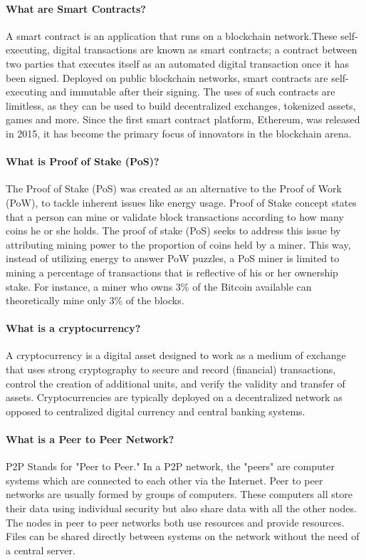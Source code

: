 \paragraph{What are Smart Contracts?} 
A smart contract is an application that runs on a blockchain network.These self-executing, digital transactions are known as smart contracts; a contract between two parties that executes itself as an automated digital transaction once it has been signed. Deployed on public blockchain networks, smart contracts are self-executing and immutable after their signing. The uses of such contracts are limitless, as they can be used to build decentralized exchanges, tokenized assets, games and more. Since the first smart contract platform, Ethereum, was released in 2015, it has become the primary focus of innovators in the blockchain arena.

\paragraph{What is Proof of Stake (PoS)?} The Proof of Stake (PoS) was created as an alternative to the Proof of Work (PoW), to tackle inherent issues like energy usage. Proof of Stake concept states that a person can mine or validate block transactions according to how many coins he or she holds. The proof of stake (PoS) seeks to address this issue by attributing mining power to the proportion of coins held by a miner. This way, instead of utilizing energy to answer PoW puzzles, a PoS miner is limited to mining a percentage of transactions that is reflective of his or her ownership stake. For instance, a miner who owns 3\% of the Bitcoin available can theoretically mine only 3\% of the blocks.

\paragraph{What is a cryptocurrency?} A cryptocurrency is a digital asset designed to work as a medium of exchange that uses strong cryptography to secure and record (financial) transactions, control the creation of additional units, and verify the validity and transfer of assets. Cryptocurrencies are typically deployed on a decentralized network as opposed to centralized digital currency and central banking systems.

\paragraph{What is a Peer to Peer Network?} P2P Stands for "Peer to Peer." In a P2P network, the "peers" are computer systems which are connected to each other via the Internet. Peer to peer networks are usually formed by groups of computers. These computers all store their data using individual security but also share data with all the other nodes. The nodes in peer to peer networks both use resources and provide resources. Files can be shared directly between systems on the network without the need of a central server. 

